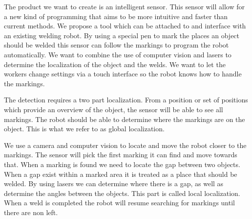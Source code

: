 
The product we want to create is an intelligent sensor.
This sensor will allow for a new kind of programming that aims to be more intuitive and faster than current methods.
We propose a tool which can be attached to and interface with an existing welding robot. 
By using a special pen to mark the places an object should be welded this sensor can follow the markings to program the robot automatically.
We want to combine the use of computer vision and lasers to determine the localization of the object and the welds.
We want to let the workers change settings via a touch interface so the robot knows how to handle the markings. 

The detection requires a two part localization. 
From a position or set of positions which provide an overview of the object, the sensor will be able to see all markings.
The robot should be able to determine where the markings are on the object. 
This is what we refer to as global localization.

We use a camera and computer vision to locate and move the robot closer to the markings.
The sensor will pick the first marking it can find and move towards that. 
When a marking is found we need to locate the gap between two objects. 
When a gap exist within a marked area it is treated as a place that should be welded.
By using lasers we can determine where there is a gap, as well as determine the angles between the objects.
This part is called local localization.
When a weld is completed the robot will resume searching for markings until there are non left.
